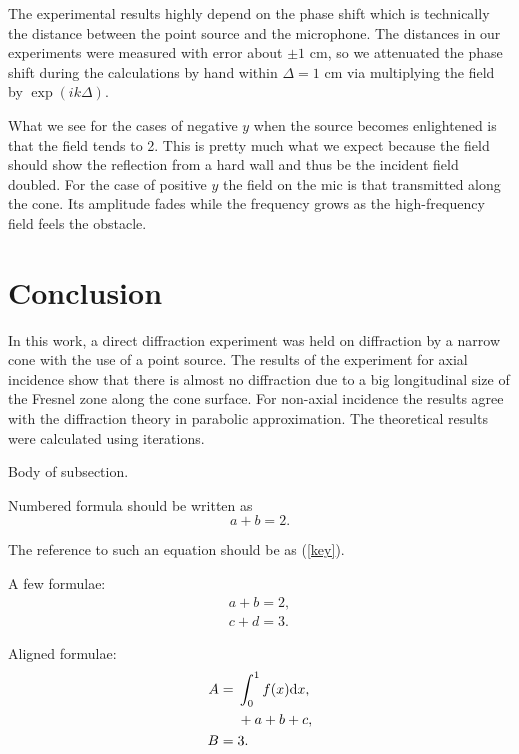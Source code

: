 \documentclass{procDDs}
\begin{document}
The experimental results highly depend on the phase shift which is technically the distance between the point source and the microphone. The distances in our experiments were measured with error about $\pm 1$ cm, so we attenuated the phase shift during the calculations by hand within $\Delta = 1$ cm via multiplying the field by $\exp(ik\Delta)$.

What we see for the cases of negative $y$ when the source becomes enlightened is that the field tends to 2. This is pretty much what we expect because the field should show the reflection from a hard wall and thus be the incident field doubled. For the case of positive $y$ the field on the mic is that transmitted along the cone. Its amplitude fades while the frequency grows as the high-frequency field feels the obstacle.

\section{Conclusion}

In this work, a direct diffraction experiment was held on diffraction by a narrow cone with the use of a point source. The results of the experiment for axial incidence show that there is almost no diffraction due to a big longitudinal size of the Fresnel zone along the cone surface. For non-axial incidence the results agree with the diffraction theory in parabolic approximation. The theoretical results were calculated using iterations.


\iffalse 

Body of subsection.

Numbered formula should be written as
\begin{equation}\label{key}                       %
a+b=2.                                         %
\end{equation}

The reference to such an equation should be as (\ref{key}).

A few formulae:
\begin{gather}                       %
a+b=2,\label{key1}\\
c+d=3.\label{key2}
\end{gather}


Aligned formulae:
\begin{align}                       %
A={}&\int_0^1f(x)\mathrm{d}x,\notag\\
&{}+a+b+c,\label{key3}\\
B={}&3.\label{key4}
\end{align}
\end{document}
